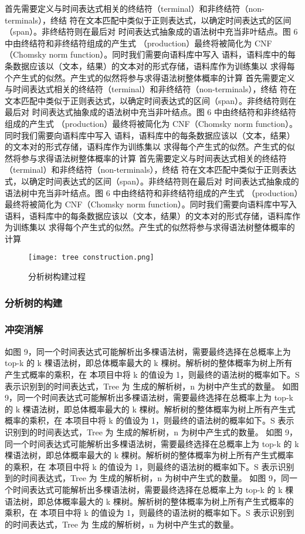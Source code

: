首先需要定义与时间表达式相关的终结符（terminal）和非终结符（non-terminals），终结
符在文本匹配中类似于正则表达式，以确定时间表达式的区间（span）。非终结符则在最后对
时间表达式抽象成的语法树中充当非叶结点。图 6 中由终结符和非终结符组成的产生式
（production）最终将被简化为 CNF（Chomsky norm function）。同时我们需要向语料库中写入
语料，语料库中的每条数据应该以（文本，结果）的文本对的形式存储，语料库作为训练集以
求得每个产生式的似然。产生式的似然将参与求得语法树整体概率的计算
首先需要定义与时间表达式相关的终结符（terminal）和非终结符（non-terminals），终结
符在文本匹配中类似于正则表达式，以确定时间表达式的区间（span）。非终结符则在最后对
时间表达式抽象成的语法树中充当非叶结点。图 6 中由终结符和非终结符组成的产生式
（production）最终将被简化为 CNF（Chomsky norm function）。同时我们需要向语料库中写入
语料，语料库中的每条数据应该以（文本，结果）的文本对的形式存储，语料库作为训练集以
求得每个产生式的似然。产生式的似然将参与求得语法树整体概率的计算
首先需要定义与时间表达式相关的终结符（terminal）和非终结符（non-terminals），终结
符在文本匹配中类似于正则表达式，以确定时间表达式的区间（span）。非终结符则在最后对
时间表达式抽象成的语法树中充当非叶结点。图 6 中由终结符和非终结符组成的产生式
（production）最终将被简化为 CNF（Chomsky norm function）。同时我们需要向语料库中写入
语料，语料库中的每条数据应该以（文本，结果）的文本对的形式存储，语料库作为训练集以
求得每个产生式的似然。产生式的似然将参与求得语法树整体概率的计算

\begin{figure}[h]
    \centering
    \texttt{[image: tree construction.png]}
    \caption{分析树构建过程}
    \label{fig:badge}
\end{figure}

\subsubsection{分析树的构建}

\subsubsection{冲突消解}

如图 9，同一个时间表达式可能解析出多棵语法树，需要最终选择在总概率上为 top-k 的
k 棵语法树，即总体概率最大的 k 棵树。解析树的整体概率为树上所有产生式概率的乘积，在
本项目中将 k 的值设为 1，则最终的语法树的概率如下。S 表示识别到的时间表达式，Tree 为
生成的解析树，n 为树中产生式的数量。
如图 9，同一个时间表达式可能解析出多棵语法树，需要最终选择在总概率上为 top-k 的
k 棵语法树，即总体概率最大的 k 棵树。解析树的整体概率为树上所有产生式概率的乘积，在
本项目中将 k 的值设为 1，则最终的语法树的概率如下。S 表示识别到的时间表达式，Tree 为
生成的解析树，n 为树中产生式的数量。
如图 9，同一个时间表达式可能解析出多棵语法树，需要最终选择在总概率上为 top-k 的
k 棵语法树，即总体概率最大的 k 棵树。解析树的整体概率为树上所有产生式概率的乘积，在
本项目中将 k 的值设为 1，则最终的语法树的概率如下。S 表示识别到的时间表达式，Tree 为
生成的解析树，n 为树中产生式的数量。
如图 9，同一个时间表达式可能解析出多棵语法树，需要最终选择在总概率上为 top-k 的
k 棵语法树，即总体概率最大的 k 棵树。解析树的整体概率为树上所有产生式概率的乘积，在
本项目中将 k 的值设为 1，则最终的语法树的概率如下。S 表示识别到的时间表达式，Tree 为
生成的解析树，n 为树中产生式的数量。


